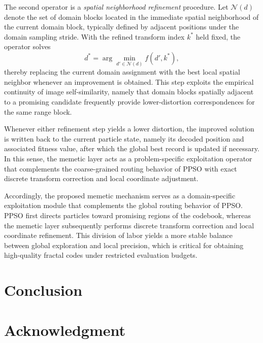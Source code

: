 \documentclass[conference]{IEEEtran}
\begin{document}
The second operator is a \emph{spatial neighborhood refinement} procedure. Let $\mathcal{N}(d)$ denote the set of domain blocks located in the immediate spatial neighborhood of the current domain block, typically defined by adjacent positions under the domain sampling stride. With the refined transform index $k^{*}$ held fixed, the operator solves
\begin{equation}
d^{*}=\arg\min_{d' \in \mathcal{N}(d)} f(d',k^{*}),
\end{equation}
thereby replacing the current domain assignment with the best local spatial neighbor whenever an improvement is obtained. This step exploits the empirical continuity of image self-similarity, namely that domain blocks spatially adjacent to a promising candidate frequently provide lower-distortion correspondences for the same range block.

Whenever either refinement step yields a lower distortion, the improved solution is written back to the current particle state, namely its decoded position and associated fitness value, after which the global best record is updated if necessary. In this sense, the memetic layer acts as a problem-specific exploitation operator that complements the coarse-grained routing behavior of PPSO with exact discrete transform correction and local coordinate adjustment.

Accordingly, the proposed memetic mechanism serves as a domain-specific exploitation module that complements the global routing behavior of PPSO. PPSO first directs particles toward promising regions of the codebook, whereas the memetic layer subsequently performs discrete transform correction and local coordinate refinement. This division of labor yields a more stable balance between global exploration and local precision, which is critical for obtaining high-quality fractal codes under restricted evaluation budgets.

\section{Conclusion}
\section*{Acknowledgment}





\vspace{12pt}
\end{document}
